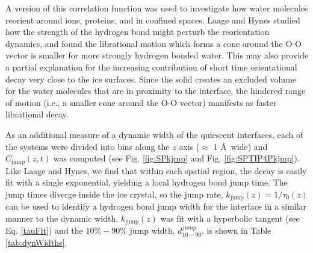 A version of this correlation function was used to investigate how
water molecules reorient around
ions\cite{Laage2007,Laage2008a,Stirnemann2011a,Laage2011},
proteins\cite{Duboue-Dijon2014}, and in confined
spaces\cite{Laage2012b,Fogarty2014}.  Laage and Hynes studied how the
strength of the hydrogen bond might perturb the reorientation
dynamics,\cite{Laage2006a} and found the librational motion which
forms a cone around the O-O vector is smaller for more strongly
hydrogen bonded water. This may also provide a partial explanation for
the increasing contribution of short time orientational decay very
close to the ice surfaces.  Since the solid creates an excluded volume
for the water molecules that are in proximity to the interface, the
hindered range of motion (i.e., a smaller cone around the O-O vector)
manifests as faster librational decay.

As an additional measure of a dynamic width of the quiescent
interfaces, each of the systems were divided into bins along the $z$
axis ($\approx$ 1 \AA\ wide) and $C_\mathrm{jump}(z,t)$ was computed
(see Fig. \ref{fig:SPkjmp} and Fig. \ref{fig:SPTIP4Pkjmp}).
Like Laage and Hynes, we find that within each spatial region, the
decay is easily fit with a single exponential, yielding a local
hydrogen bond jump time. The jump times diverge inside the ice
crystal, so the jump rate, $k_\mathrm{jump}(z) = 1 / \tau_0(z)$ can be
used to identify a hydrogen bond jump width for the interface in a
similar manner to the dynamic width. $k_\mathrm{jump}(z)$ was fit with
a hyperbolic tangent (see Eq. \eqref{tauFit}) and the $10\%-90\%$ jump
width, $d_\mathrm{10-90}^{jump}$, is shown in Table \ref{tab:dynWidths}.

